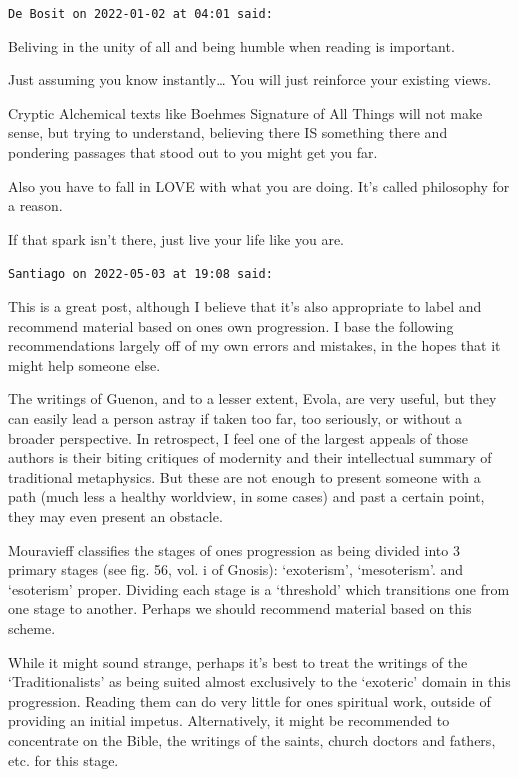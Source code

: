 \begin{footnotesize}\begin{sffamily}



\texttt{De Bosit on 2022-01-02 at 04:01 said: }

Beliving in the unity of all and being humble when reading is important.

Just assuming you know instantly… You will just reinforce your existing views.

Cryptic Alchemical texts like Boehmes Signature of All Things will not make sense, but trying to understand, believing there IS something there and pondering passages that stood out to you might get you far.

Also you have to fall in LOVE with what you are doing. It's called philosophy for a reason.

If that spark isn't there, just live your life like you are.


\hfill

\texttt{Santiago on 2022-05-03 at 19:08 said: }

This is a great post, although I believe that it's also appropriate to label and recommend material based on ones own progression. I base the following recommendations largely off of my own errors and mistakes, in the hopes that it might help someone else. 

The writings of Guenon, and to a lesser extent, Evola, are very useful, but they can easily lead a person astray if taken too far, too seriously, or without a broader perspective. In retrospect, I feel one of the largest appeals of those authors is their biting critiques of modernity and their intellectual summary of traditional metaphysics. But these are not enough to present someone with a path (much less a healthy worldview, in some cases) and past a certain point, they may even present an obstacle.

Mouravieff classifies the stages of ones progression as being divided into 3 primary stages (see fig. 56, vol. i of Gnosis): `exoterism’, ‘mesoterism'. and `esoterism' proper. Dividing each stage is a `threshold' which transitions one from one stage to another. Perhaps we should recommend material based on this scheme.

While it might sound strange, perhaps it's best to treat the writings of the `Traditionalists' as being suited almost exclusively to the `exoteric' domain in this progression. Reading them can do very little for ones spiritual work, outside of providing an initial impetus. Alternatively, it might be recommended to concentrate on the Bible, the writings of the saints, church doctors and fathers, etc. for this stage.


\end{sffamily}
\end{footnotesize}

